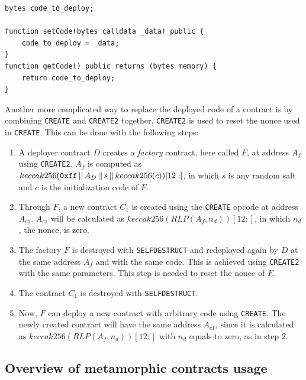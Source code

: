 \begin{lstlisting}[label={lst:meta-2},caption={Pseudo code of a contract that gives back the code to be deployed.}]
bytes code_to_deploy;

function setCode(bytes calldata _data) public {
    code_to_deploy = _data;
}
function getCode() public returns (bytes memory) {
    return code_to_deploy;
}
\end{lstlisting}

Another more complicated way to replace the deployed code of a contract is by combining {\tt CREATE} and {\tt CREATE2} together. {\tt CREATE2} is used to reset the nonce used in {\tt CREATE}. This can be done with the following steps:

\begin{enumerate}
    \item A deployer contract $D$ creates a \textit{factory} contract, here called $F$, at address $A_{f}$ using {\tt CREATE2}. $A_{f}$ is computed as $keccak256({\tt 0xff}\,||\,A_D\,||\,s\,||\,keccak256(c))[12:]$, in which $s$ is any random salt and $c$ is the initialization code of $F$.  

    \item Through $F$, a new contract $C_1$ is created using the {\tt CREATE} opcode at address $A_{c1}$. $A_{c1}$ will be calculated as $keccak256(RLP(A_f,n_d))[12:]$, in which $n_d$, the nonce, is zero.

    \item The factory $F$ is destroyed with {\tt SELFDESTRUCT} and redeployed again by $D$ at the same address $A_f$ and with the same code. This is achieved using {\tt CREATE2} with the same parameters. This step is needed to reset the nonce of $F$.

    \item The contract $C_1$ is destroyed with {\tt SELFDESTRUCT}.

    \item Now, $F$ can deploy a new contract with arbitrary code using {\tt CREATE}. The newly created contract will have the same address $A_{c1}$, since it is calculated as $keccak256(RLP(A_f,n_d))[12:]$ with $n_d$ equals to zero, as in step 2. 
    
\end{enumerate}

\subsection{Overview of metamorphic contracts usage}

